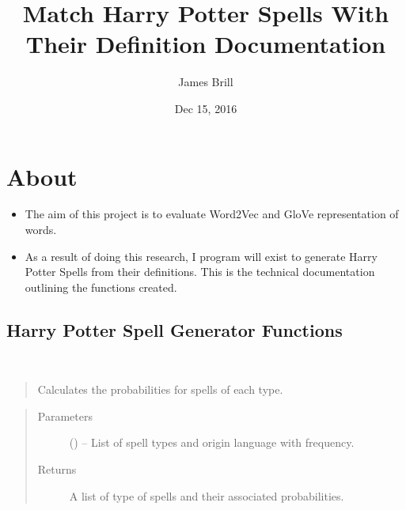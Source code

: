 \documentclass[letterpaper,10pt,english]{sphinxmanual}
\title{Match Harry Potter Spells With Their Definition Documentation}
\date{Dec 15, 2016}
\author{James Brill}
\begin{document}
\maketitle
\sphinxtableofcontents
{}\label{index::doc}



\chapter{About}
\label{index:about}\label{index:welcome-to-match-hp-spells-with-their-definitions-s-documentation}\begin{itemize}
\item {} 
The aim of this project is to evaluate Word2Vec and GloVe representation of words.

\item {} 
As a result of doing this research, I program will exist to generate Harry Potter Spells
from their definitions. This is the technical documentation outlining the functions created.

\end{itemize}


\section{Harry Potter Spell Generator Functions}
\label{code:module-hp_spells}\label{code:harry-potter-spell-generator-functions}\label{code::doc}

\begin{fulllineitems}
\label{code:hp_spells.calcProb}~\begin{quote}

Calculates the probabilities for spells of each type.
\end{quote}
\begin{quote}\begin{description}
\item[{Parameters}] \leavevmode
{} (\sphinxstyleliteralemphasis{}\sphinxstyleliteralemphasis{{[}}\sphinxstyleliteralemphasis{}\sphinxstyleliteralemphasis{{[}}\sphinxstyleliteralemphasis{}\sphinxstyleliteralemphasis{{[}}\sphinxstyleliteralemphasis{, }\sphinxstyleliteralemphasis{{]}}\sphinxstyleliteralemphasis{}\sphinxstyleliteralemphasis{, }\sphinxstyleliteralemphasis{{]}}\sphinxstyleliteralemphasis{{]}}\sphinxstyleliteralemphasis{}) -- List of spell types and origin language with frequency.

\item[{Returns}] \leavevmode
A list of type of spells and their associated probabilities.

\end{description}\end{quote}

\end{fulllineitems}
\end{document}
